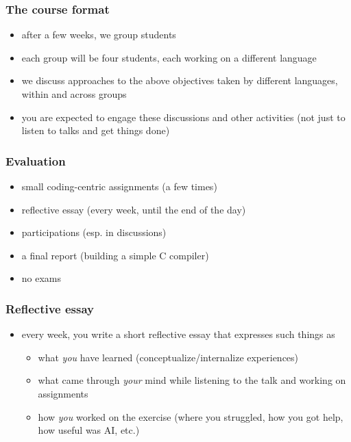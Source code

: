 \documentclass[12pt,dvipdfmx]{beamer}
\newcommand{\ao}[1]{{\color{blue}#1}}
\begin{document}
\begin{frame}
  \frametitle{The course format}
  \begin{itemize}
  \item after a few weeks, we group students
  \item each group will be four students, each working on a different language
  \item we discuss approaches to the above objectives
    taken by different languages,
    within and across groups
  \item you are expected to engage these discussions and other activities
    (not just to listen to talks and get things done)
  \end{itemize}
\end{frame}

\begin{frame}
  \frametitle{Evaluation}
  \begin{itemize}
  \item small coding-centric assignments (a few times)
  \item reflective essay (every week, until the end of the day)
  \item participations (esp. in discussions)
  \item a final report (building a simple C compiler)
  \item no exams
  \end{itemize}
\end{frame}

\begin{frame}
  \frametitle{Reflective essay}
  \begin{itemize}
  \item every week, you write a short reflective essay that expresses
    such things as
    \begin{itemize}
    \item what \ao{\it you} have learned (conceptualize/internalize experiences)
    \item what came through \ao{\it your} mind while listening to the talk
      and working on assignments
    \item how \ao{\it you} worked on the exercise
      (where you struggled, how you got help, how useful was AI, etc.)
    \end{itemize}
  \end{itemize}
\end{frame}
\end{document}
